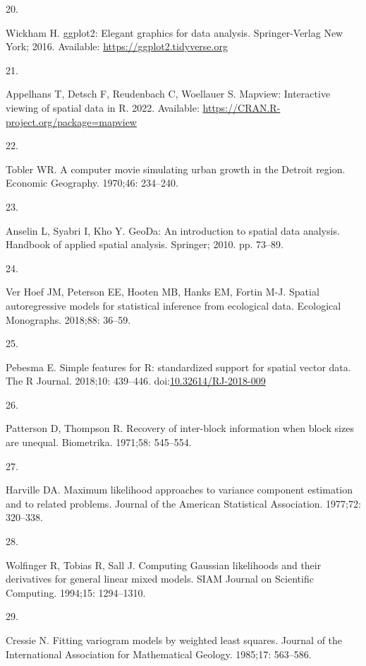 \documentclass[10pt,letterpaper]{article}
\newlength{\cslhangindent}
\newlength{\csllabelwidth}
\newlength{\cslentryspacingunit} %
\newenvironment{CSLReferences}[2] %
 {%
  \setlength{\parindent}{0pt}
  \ifodd #1
  \let\oldpar\par
  \def\par{\hangindent=\cslhangindent\oldpar}
  \fi
  \setlength{\parskip}{#2\cslentryspacingunit}
 }%
 {}
\newcommand{\CSLLeftMargin}[1]{\parbox[t]{\csllabelwidth}{#1}}
\newcommand{\CSLRightInline}[1]{\parbox[t]{\linewidth - \csllabelwidth}{#1}\break}
\begin{document}
\begin{CSLReferences}{0}{0}
\leavevmode\hypertarget{ref-wickham2016ggplot2}{}%
\CSLLeftMargin{20. }
\CSLRightInline{Wickham H. ggplot2: Elegant graphics for data analysis.
Springer-Verlag New York; 2016. Available:
\url{https://ggplot2.tidyverse.org}}

\leavevmode\hypertarget{ref-appelhans2022mapview}{}%
\CSLLeftMargin{21. }
\CSLRightInline{Appelhans T, Detsch F, Reudenbach C, Woellauer S.
Mapview: Interactive viewing of spatial data in {R}. 2022. Available:
\url{https://CRAN.R-project.org/package=mapview}}

\leavevmode\hypertarget{ref-tobler1970computer}{}%
\CSLLeftMargin{22. }
\CSLRightInline{Tobler WR. A computer movie simulating urban growth in
the {D}etroit region. Economic Geography. 1970;46: 234--240. }

\leavevmode\hypertarget{ref-anselin2010geoda}{}%
\CSLLeftMargin{23. }
\CSLRightInline{Anselin L, Syabri I, Kho Y. {GeoDa}: An introduction to
spatial data analysis. Handbook of applied spatial analysis. Springer;
2010. pp. 73--89. }

\leavevmode\hypertarget{ref-ver2018spatial}{}%
\CSLLeftMargin{24. }
\CSLRightInline{Ver Hoef JM, Peterson EE, Hooten MB, Hanks EM, Fortin
M-J. Spatial autoregressive models for statistical inference from
ecological data. Ecological Monographs. 2018;88: 36--59. }

\leavevmode\hypertarget{ref-pebesma2018sf}{}%
\CSLLeftMargin{25. }
\CSLRightInline{Pebesma E. {Simple features for {R}: standardized
support for spatial vector data}. {The R Journal}. 2018;10: 439--446.
doi:\href{https://doi.org/10.32614/RJ-2018-009}{10.32614/RJ-2018-009}}

\leavevmode\hypertarget{ref-patterson1971recovery}{}%
\CSLLeftMargin{26. }
\CSLRightInline{Patterson D, Thompson R. Recovery of inter-block
information when block sizes are unequal. Biometrika. 1971;58: 545--554.
}

\leavevmode\hypertarget{ref-harville1977maximum}{}%
\CSLLeftMargin{27. }
\CSLRightInline{Harville DA. Maximum likelihood approaches to variance
component estimation and to related problems. Journal of the American
Statistical Association. 1977;72: 320--338. }

\leavevmode\hypertarget{ref-wolfinger1994computing}{}%
\CSLLeftMargin{28. }
\CSLRightInline{Wolfinger R, Tobias R, Sall J. Computing {G}aussian
likelihoods and their derivatives for general linear mixed models. SIAM
Journal on Scientific Computing. 1994;15: 1294--1310. }

\leavevmode\hypertarget{ref-cressie1985fitting}{}%
\CSLLeftMargin{29. }
\CSLRightInline{Cressie N. Fitting variogram models by weighted least
squares. Journal of the International Association for Mathematical
Geology. 1985;17: 563--586. }


\end{CSLReferences}
\end{document}
